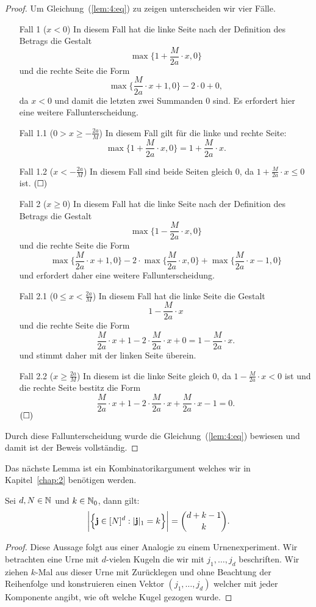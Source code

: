 \begin{proof}
Um Gleichung~(\ref{lem:4:eq}) zu zeigen unterscheiden wir vier Fälle.
  \begin{itemize}
  \item[Fall 1] ($x < 0$) In diesem Fall hat die linke Seite nach der Definition des Betrags die Gestalt $$\max\{1 + \frac{M}{2a} \cdot x, 0\}$$ und die rechte Seite die Form $$\max\{\frac{M}{2a} \cdot x + 1, 0\} - 2 \cdot 0 + 0,$$ da $x < 0$ und damit die letzten zwei Summanden 0 sind. Es erfordert hier eine weitere Fallunterscheidung.
 \item[Fall 1.1] ($0 > x \geq -\frac{2a}{M}$) In diesem Fall gilt für die linke und rechte Seite:
 $$\max\{1 + \frac{M}{2a} \cdot x, 0\} = 1 + \frac{M}{2a} \cdot x.$$
 \item[Fall 1.2] ($x < -\frac{2a}{M}$) In diesem Fall sind beide Seiten gleich 0, da $1 + \frac{M}{2a} \cdot x \leq 0$ ist. $\hfill(\square)$
  \item[Fall 2] ($x \geq 0$) In diesem Fall hat die linke Seite nach der Definition des Betrags die Gestalt $$\max\{1 - \frac{M}{2a} \cdot x, 0\}$$ und die rechte Seite die Form $$\max\{\frac{M}{2a} \cdot x + 1, 0\} - 2 \cdot \max\{\frac{M}{2a} \cdot x, 0\} + \max\{\frac{M}{2a} \cdot x - 1, 0\}$$ und erfordert daher eine weitere Fallunterscheidung.
 \item[Fall 2.1] ($0 \leq x < \frac{2a}{M}$) In diesem Fall hat die linke Seite die Gestalt $$1 - \frac{M}{2a} \cdot x$$ und die rechte Seite die Form $$\frac{M}{2a} \cdot x + 1 - 2 \cdot \frac{M}{2a} \cdot x + 0 = 1 - \frac{M}{2a} \cdot x.$$ und stimmt daher mit der linken Seite überein.
 \item[Fall 2.2] ($x \geq \frac{2a}{M}$) In diesem ist die linke Seite gleich 0, da $1 - \frac{M}{2a} \cdot x < 0$ ist und die rechte Seite bestitz die Form $$\frac{M}{2a} \cdot x + 1 - 2 \cdot \frac{M}{2a} \cdot x + \frac{M}{2a} \cdot x - 1 = 0.$$ $\hfill(\square)$
\end{itemize} 
Durch diese Fallunterscheidung wurde die Gleichung~(\ref{lem:4:eq}) bewiesen und damit ist der Beweis vollständig.
  \end{proof}
Das nächste Lemma ist ein Kombinatorikargument welches wir in Kapitel~\ref{chap:2} benötigen werden.
\begin{lem}
\label{lem:kombi}
Sei $d, N \in \mathbb{N}$ und $k \in \mathbb{N}_0$, dann gilt:
$$\bigg|\Bigl\{\mathbf{j} \in [N]^d : |\mathbf{j}|_1 = k \Bigr\}\bigg| = \binom{d + k - 1}{k}.$$
\end{lem}
\begin{proof}
Diese Aussage folgt aus einer Analogie zu einem Urnenexperiment. Wir betrachten eine Urne mit $d$-vielen Kugeln die wir mit $j_1,\dots,j_d$ beschriften. Wir ziehen $k$-Mal aus dieser Urne mit Zurücklegen und ohne Beachtung der Reihenfolge und konstruieren einen Vektor $(j_1,\dots,j_d)$ welcher mit jeder Komponente angibt, wie oft welche Kugel gezogen wurde.
\end{proof}